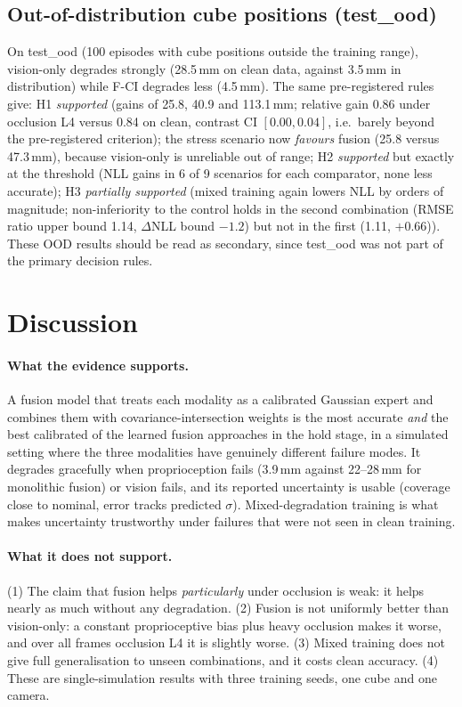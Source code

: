 \documentclass[11pt,a4paper]{article}
\begin{document}
\subsection{Out-of-distribution cube positions (test\_ood)}
On test\_ood (100 episodes with cube positions outside the training range), vision-only degrades strongly (28.5\,mm on clean data, against 3.5\,mm in distribution) while F-CI degrades less (4.5\,mm). The same pre-registered rules give:
H1 \emph{supported} (gains of 25.8, 40.9 and 113.1\,mm; relative gain 0.86 under occlusion L4 versus 0.84 on clean, contrast CI $[0.00,0.04]$, i.e.\ barely beyond the pre-registered criterion); the stress scenario now \emph{favours} fusion (25.8 versus 47.3\,mm), because vision-only is unreliable out of range;
H2 \emph{supported} but exactly at the threshold (NLL gains in 6 of 9 scenarios for each comparator, none less accurate);
H3 \emph{partially supported} (mixed training again lowers NLL by orders of magnitude; non-inferiority to the control holds in the second combination (RMSE ratio upper bound 1.14, $\Delta$NLL bound $-1.2$) but not in the first (1.11, $+0.66$)). These OOD results should be read as secondary, since test\_ood was not part of the primary decision rules.

\section{Discussion}
\paragraph{What the evidence supports.}
A fusion model that treats each modality as a calibrated Gaussian expert and combines them with covariance-intersection weights is the most accurate \emph{and} the best calibrated of the learned fusion approaches in the hold stage, in a simulated setting where the three modalities have genuinely different failure modes. It degrades gracefully when proprioception fails (3.9\,mm against 22--28\,mm for monolithic fusion) or vision fails, and its reported uncertainty is usable (coverage close to nominal, error tracks predicted $\sigma$). Mixed-degradation training is what makes uncertainty trustworthy under failures that were not seen in clean training.

\paragraph{What it does not support.}
(1) The claim that fusion helps \emph{particularly} under occlusion is weak: it helps nearly as much without any degradation. (2) Fusion is not uniformly better than vision-only: a constant proprioceptive bias plus heavy occlusion makes it worse, and over all frames occlusion L4 it is slightly worse. (3) Mixed training does not give full generalisation to unseen combinations, and it costs clean accuracy. (4) These are single-simulation results with three training seeds, one cube and one camera.
\end{document}

